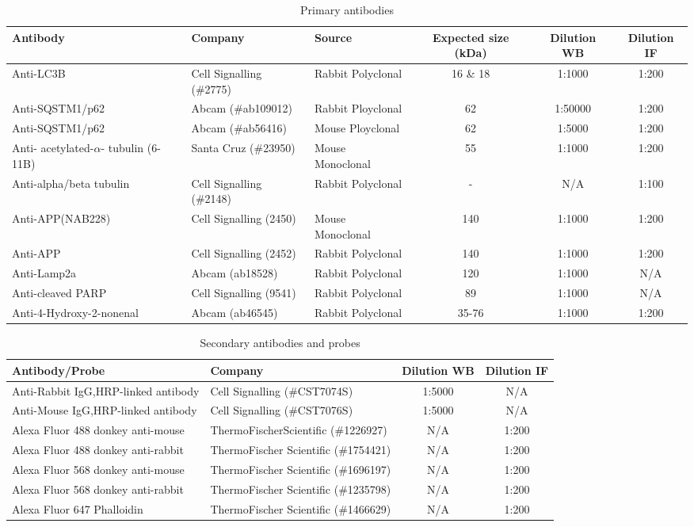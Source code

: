 \begin{landscape}
\begin{table}[p]
\centering
\caption[Primary antibodies]{Primary antibodies}
\label{tab:20_prim}
\begin{tabular}{lllccc}
\toprule
Antibody & Company & Source & Expected size (kDa) & Dilution WB & Dilution IF \\
\midrule
Anti-LC3B & Cell Signalling (\#2775) & Rabbit Polyclonal & 16 \& 18 & 1:1000 & 1:200 \\
Anti-SQSTM1/p62 & Abcam (\#ab109012) & Rabbit Ployclonal & 62 & 1:50000 & 1:200 \\
Anti-SQSTM1/p62 & Abcam (\#ab56416) & Mouse Ployclonal & 62 & 1:5000 & 1:200 \\
Anti- acetylated-$\alpha$- tubulin (6-11B) & Santa Cruz (\#23950) & Mouse Monoclonal & 55 & 1:1000 & 1:200 \\
Anti-alpha/beta tubulin & Cell Signalling (\#2148) & Rabbit Polyclonal & - & N/A & 1:100 \\
Anti-APP(NAB228) & Cell Signalling (2450) & Mouse Monoclonal & 140 & 1:1000 & 1:200 \\
Anti-APP & Cell Signalling (2452) & Rabbit Polyclonal & 140 & 1:1000 & 1:200 \\
Anti-Lamp2a & Abcam (ab18528) & Rabbit Polyclonal & 120 & 1:1000 & N/A \\
Anti-cleaved PARP & Cell Signalling (9541) & Rabbit Polyclonal & 89 & 1:1000 & N/A \\
Anti-4-Hydroxy-2-nonenal & Abcam (ab46545) & Rabbit Polyclonal & 35-76 & 1:1000 & 1:200 \\
\bottomrule
\end{tabular}
\end{table}
\begin{table}[p]
\centering
\caption[Secondary antibodies and probes]{Secondary antibodies and probes}
\label{tab:20_sec}
\begin{tabular}{llcc}
\toprule
Antibody/Probe & Company & Dilution WB & Dilution IF \\
\midrule
Anti-Rabbit IgG,HRP-linked antibody & Cell Signalling (\#CST7074S) & 1:5000 & N/A \\
Anti-Mouse IgG,HRP-linked antibody & Cell Signalling (\#CST7076S) & 1:5000 & N/A \\
Alexa Fluor 488 donkey anti-mouse & ThermoFischerScientific (\#1226927) & N/A & 1:200 \\
Alexa Fluor 488 donkey anti-rabbit & ThermoFischer Scientific (\#1754421) & N/A & 1:200 \\
Alexa Fluor 568 donkey anti-mouse & ThermoFischer Scientific (\#1696197) & N/A & 1:200 \\
Alexa Fluor 568 donkey anti-rabbit & ThermoFischer Scientific (\#1235798) & N/A & 1:200 \\
Alexa Fluor 647 Phalloidin & ThermoFischer Scientific (\#1466629) & N/A & 1:200 \\
\bottomrule
\end{tabular}
\end{table}
\end{landscape}

